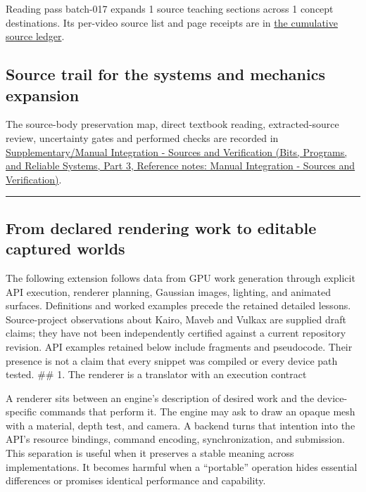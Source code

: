 Reading pass batch-017 expands 1 source teaching sections across 1 concept destinations. Its per-video source list and page receipts are in \hyperref[appendix-877738f6f4d2-batch-017-expanded-reading-and-integration]{the cumulative source ledger}.

\subsection{Source trail for the systems and mechanics expansion}\label{06-engine-ii-ch042-source-trail-for-the-systems-and-mechanics-expansion}

\hypertarget{06-engine-ii-ch042-source-trail-for-the-systems-and-mechanics-expansion}{}

The source-body preservation map, direct textbook reading, extracted-source review, uncertainty gates and performed checks are recorded in \href{../01-Bits-Programs-and-Reliable-Systems-P03/main.pdf\#nameddest=appendix-3b67654799a2}{Supplementary/Manual Integration - Sources and Verification (Bits, Programs, and Reliable Systems, Part 3, Reference notes: Manual Integration - Sources and Verification)}.

\begin{center}\rule{0.5\linewidth}{0.5pt}\end{center}

\subsection{From declared rendering work to editable captured worlds}\label{06-engine-ii-ch042-from-declared-rendering-work-to-editable-captured-worlds}

\hypertarget{06-engine-ii-ch042-from-declared-rendering-work-to-editable-captured-worlds}{}

The following extension follows data from GPU work generation through explicit API execution, renderer planning, Gaussian images, lighting, and animated surfaces. Definitions and worked examples precede the retained detailed lessons. Source-project observations about Kairo, Maveb and Vulkax are supplied draft claims; they have not been independently certified against a current repository revision. API examples retained below include fragments and pseudocode. Their presence is not a claim that every snippet was compiled or every device path tested. \#\# 1. The renderer is a translator with an execution contract

A renderer sits between an engine's description of desired work and the device-specific commands that perform it. The engine may ask to draw an opaque mesh with a material, depth test, and camera. A backend turns that intention into the API's resource bindings, command encoding, synchronization, and submission. This separation is useful when it preserves a stable meaning across implementations. It becomes harmful when a ``portable'' operation hides essential differences or promises identical performance and capability.

